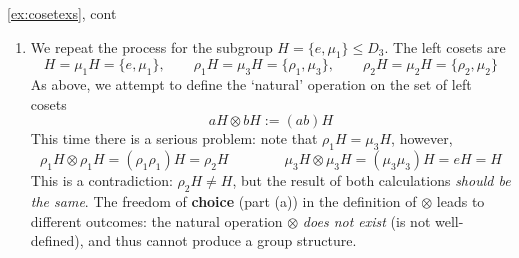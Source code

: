 \begin{examples*}{\ref{ex:cosetexs}, cont}{}
\begin{enumerate}
		
		
	
		\item We repeat the process for the subgroup $H=\{e,\mu_1\}\le D_3$. The left cosets are
		\[
			H=\mu_1H=\{e,\mu_1\},\qquad
			\rho_1H=\mu_3H=\{\rho_1,\mu_3\},\qquad
			\rho_2H=\mu_2H=\{\rho_2,\mu_2\}
		\]
		As above, we attempt to define the `natural' operation on the set of left cosets
		\[
			aH\otimes bH:=(ab)H \tag{$ab$ is composition/multiplication within $D_3$}
		\]
		This time there is a serious problem: note that $\rho_1H=\mu_3H$, however,
		\[
			\rho_1H\otimes\rho_1H =(\rho_1\rho_1)H =\rho_2H\qquad\qquad
			\mu_3H\otimes \mu_3H=(\mu_3\mu_3)H =eH =H
		\]
		This is a contradiction: $\rho_2H\neq H$, but the result of both calculations \emph{should be the same}. The freedom of \textbf{choice} (part (a)) in the definition of $\otimes$ leads to different outcomes: the natural operation $\otimes$ \emph{does not exist} (is not well-defined), and thus cannot produce a group structure.
	\end{enumerate}
\end{examples*}
